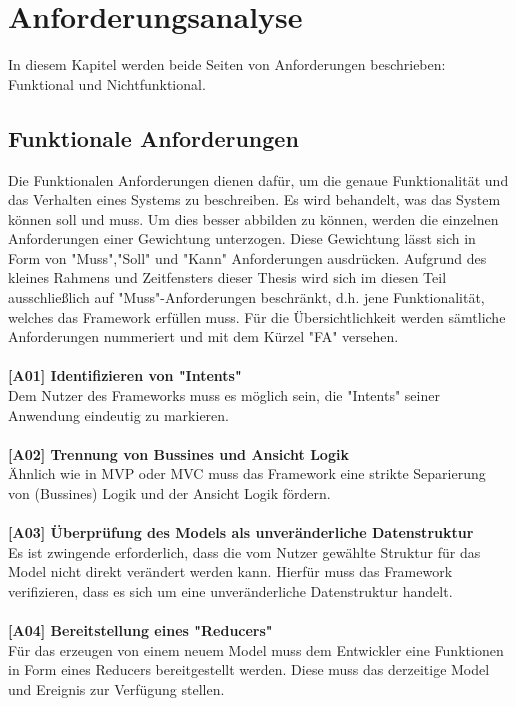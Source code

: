 \section{Anforderungsanalyse}
\label{sec:anforderungsanalyse}
In diesem Kapitel werden beide Seiten von Anforderungen beschrieben: Funktional und Nichtfunktional. 

\subsection{Funktionale Anforderungen}
Die Funktionalen Anforderungen dienen dafür, um die genaue Funktionalität und das Verhalten eines Systems zu beschreiben. Es wird behandelt, was das System können soll und muss. Um dies besser abbilden zu können, werden die einzelnen Anforderungen einer Gewichtung unterzogen. Diese Gewichtung lässt sich in Form von "Muss","Soll" und "Kann" Anforderungen ausdrücken. Aufgrund des kleines Rahmens und Zeitfensters dieser Thesis wird sich im diesen Teil ausschließlich auf "Muss"-Anforderungen beschränkt, d.h. jene Funktionalität, welches das Framework erfüllen muss. Für die Übersichtlichkeit werden sämtliche Anforderungen nummeriert und mit dem Kürzel "FA" versehen.
\\
\\
\textbf{[A01] Identifizieren von "Intents"}
\\
Dem Nutzer des Frameworks muss es möglich sein, die "Intents" seiner Anwendung eindeutig zu markieren.
\\
\\
\textbf{[A02] Trennung von Bussines und Ansicht Logik}
\\
Ähnlich wie in MVP oder MVC muss das Framework eine strikte Separierung von (Bussines) Logik und der Ansicht Logik fördern. 
\\
\\
\textbf{[A03] Überprüfung des Models als unveränderliche Datenstruktur}
\\
Es ist zwingende erforderlich, dass die vom Nutzer gewählte Struktur für das Model nicht direkt verändert werden kann. Hierfür muss das Framework verifizieren, dass es sich um  eine  unveränderliche Datenstruktur
handelt.
\\
\\
\textbf{[A04] Bereitstellung eines "Reducers"}
\\
Für das erzeugen von einem neuem Model muss dem Entwickler eine Funktionen in Form eines Reducers bereitgestellt werden. Diese muss das derzeitige Model und Ereignis zur Verfügung stellen. 
